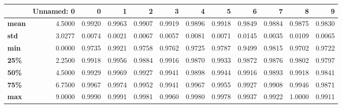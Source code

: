 \begin{tabular}{lrrrrrrrrrrr}
\toprule
{} &  Unnamed: 0 &       0 &       1 &       2 &       3 &       4 &       5 &       6 &       7 &       8 &       9 \\
\midrule
\textbf{mean} &      4.5000 &  0.9920 &  0.9963 &  0.9907 &  0.9919 &  0.9896 &  0.9918 &  0.9849 &  0.9884 &  0.9875 &  0.9830 \\
\textbf{std } &      3.0277 &  0.0074 &  0.0021 &  0.0067 &  0.0057 &  0.0081 &  0.0071 &  0.0145 &  0.0035 &  0.0109 &  0.0065 \\
\textbf{min } &      0.0000 &  0.9735 &  0.9921 &  0.9758 &  0.9762 &  0.9725 &  0.9787 &  0.9499 &  0.9815 &  0.9702 &  0.9722 \\
\textbf{25\% } &      2.2500 &  0.9918 &  0.9956 &  0.9884 &  0.9916 &  0.9870 &  0.9933 &  0.9872 &  0.9876 &  0.9802 &  0.9797 \\
\textbf{50\% } &      4.5000 &  0.9929 &  0.9969 &  0.9927 &  0.9941 &  0.9898 &  0.9944 &  0.9916 &  0.9893 &  0.9918 &  0.9841 \\
\textbf{75\% } &      6.7500 &  0.9967 &  0.9974 &  0.9952 &  0.9941 &  0.9967 &  0.9955 &  0.9927 &  0.9908 &  0.9946 &  0.9871 \\
\textbf{max } &      9.0000 &  0.9990 &  0.9991 &  0.9981 &  0.9960 &  0.9980 &  0.9978 &  0.9937 &  0.9922 &  1.0000 &  0.9911 \\
\bottomrule
\end{tabular}
